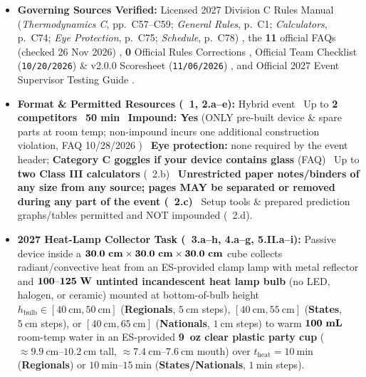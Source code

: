 \begin{rulebox}
\footnotesize
\begin{itemize}
  \item \textbf{Governing Sources Verified:} Licensed 2027 Division C Rules Manual (\emph{Thermodynamics C}, pp.\ C57--C59; \emph{General Rules}, p.\ C1; \emph{Calculators}, p.\ C74; \emph{Eye Protection}, p.\ C75; \emph{Schedule}, p.\ C78) , the \textbf{11} official FAQs (checked 26 Nov 2026) , \textbf{0} Official Rules Corrections , Official Team Checklist (\texttt{10/20/2026}) \& v2.0.0 Scoresheet (\texttt{11/06/2026}) , and Official 2027 Event Supervisor Testing Guide .
  \item \textbf{Format \& Permitted Resources (\RULEf\ 1, 2.a--e):} Hybrid event \textbar\ Up to \textbf{2 competitors} \textbar\ \textbf{50 min} \textbar\ \textbf{Impound: Yes} (ONLY pre-built device \& spare parts at room temp; non-impound incurs one additional construction violation, FAQ 10/28/2026 ) \textbar\ \textbf{Eye protection:} none required by the event header; \textbf{Category C goggles if your device contains glass} (FAQ) \textbar\ Up to \textbf{two Class III calculators} (\RULEf\ 2.b) \textbar\ \textbf{Unrestricted paper notes/binders of any size from any source; pages MAY be separated or removed during any part of the event (\RULEf\ 2.c)} \textbar\ Setup tools \& prepared prediction graphs/tables permitted and NOT impounded (\RULEf\ 2.d).
  \item \textbf{2027 Heat-Lamp Collector Task (\RULEf\ 3.a--h, 4.a--g, 5.II.a--i):} Passive device inside a $\mathbf{30.0\text{ \textbf{cm}}\times 30.0\text{ \textbf{cm}}\times 30.0\text{ \textbf{cm}}}$ cube collects radiant/convective heat from an ES-provided clamp lamp with metal reflector and $\mathbf{100\text{--}125\text{ \textbf{W}}}$ \textbf{untinted incandescent heat lamp bulb} (no LED, halogen, or ceramic) mounted at bottom-of-bulb height $h_{\mathrm{bulb}} \in [\SI{40}{\centi\meter},\SI{50}{\centi\meter}]$ (\textbf{Regionals}, $\SI{5}{\centi\meter}$ steps), $[\SI{40}{\centi\meter},\SI{55}{\centi\meter}]$ (\textbf{States}, $\SI{5}{\centi\meter}$ steps), or $[\SI{40}{\centi\meter},\SI{65}{\centi\meter}]$ (\textbf{Nationals}, $\SI{1}{\centi\meter}$ steps) to warm $\mathbf{100\text{ \textbf{mL}}}$ room-temp water in an ES-provided \textbf{9~oz clear plastic party cup} ($\approx\SIrange{9.9}{10.2}{\centi\meter}$ tall, $\approx\SIrange{7.4}{7.6}{\centi\meter}$ mouth) over $t_{\mathrm{heat}} = \SI{10}{\minute}$ (\textbf{Regionals}) or $\SIrange{10}{15}{\minute}$ (\textbf{States/Nationals}, $\SI{1}{\minute}$ steps).

\end{itemize}
\end{rulebox}
